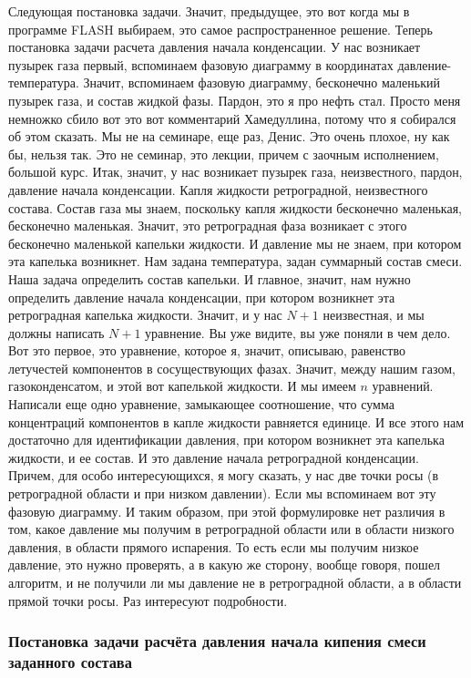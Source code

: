 \documentclass[main.tex]{subfiles}
\begin{document}
Следующая постановка задачи.
Значит, предыдущее, это вот когда мы в программе FLASH выбираем, это самое распространенное решение.
Теперь постановка задачи расчета давления начала конденсации.
У нас возникает пузырек газа первый, вспоминаем фазовую диаграмму в координатах давление-температура.
Значит, вспоминаем фазовую диаграмму, бесконечно маленький пузырек газа, и состав жидкой фазы.
Пардон, это я про нефть стал.
Просто меня немножко сбило вот это вот комментарий Хамедуллина, потому что я собирался об этом сказать.
Мы не на семинаре, еще раз, Денис.
Это очень плохое, ну как бы, нельзя так.
Это не семинар, это лекции, причем с заочным исполнением, большой курс.
Итак, значит, у нас возникает пузырек газа, неизвестного, пардон, давление начала конденсации.
Капля жидкости ретроградной, неизвестного состава.
Состав газа мы знаем, поскольку капля жидкости бесконечно маленькая, бесконечно маленькая.
Значит, это ретроградная фаза возникает с этого бесконечно маленькой капельки жидкости.
И давление мы не знаем, при котором эта капелька возникнет.
Нам задана температура, задан суммарный состав смеси.
Наша задача определить состав капельки.
И главное, значит, нам нужно определить давление начала конденсации, при котором возникнет эта ретроградная капелька жидкости.
Значит, и у нас $N+1$ неизвестная, и мы должны написать $N+1$ уравнение.
Вы уже видите, вы уже поняли в чем дело.
Вот это первое, это уравнение, которое я, значит, описываю, равенство летучестей компонентов в сосуществующих фазах.
Значит, между нашим газом, газоконденсатом, и этой вот капелькой жидкости.
И мы имеем $n$ уравнений.
Написали еще одно уравнение, замыкающее соотношение, что сумма концентраций компонентов в капле жидкости равняется единице.
И все этого нам достаточно для идентификации давления, при котором возникнет эта капелька жидкости, и ее состав.
И это давление начала ретроградной конденсации.
Причем, для особо интересующихся, я могу сказать, у нас две точки росы (в ретроградной области и при низком давлении).
Если мы вспоминаем вот эту фазовую диаграмму.
И таким образом, при этой формулировке нет различия в том, какое давление мы получим в ретроградной области или в области низкого давления, в области прямого испарения.
То есть если мы получим низкое давление, это нужно проверять, а в какую же сторону, вообще говоря, пошел алгоритм, и не получили ли мы давление не в ретроградной области, а в области прямой точки росы.
Раз интересуют подробности.

\subsubsection{Постановка задачи расчёта давления начала кипения смеси заданного состава}
\end{document}
